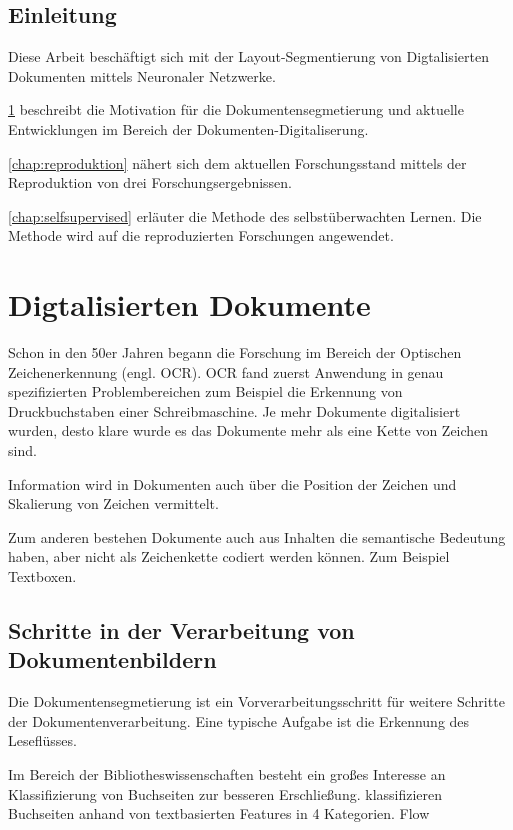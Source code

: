 \section*{Einleitung}
Diese Arbeit beschäftigt sich mit der Layout-Segmentierung von Digtalisierten Dokumenten mittels Neuronaler Netzwerke.

\cref{chap:documents} beschreibt die Motivation für die Dokumentensegmetierung und aktuelle Entwicklungen im
Bereich der Dokumenten-Digitaliserung.

\cref{chap:reproduktion} nähert sich dem aktuellen Forschungsstand mittels der Reproduktion von drei Forschungsergebnissen.

\cref{chap:selfsupervised} erläuter die Methode des selbstüberwachten Lernen. Die Methode wird auf die reproduzierten Forschungen angewendet.

\chapter{Digtalisierten Dokumente}
\label{chap:documents}


% 
Schon in den 50er Jahren begann die Forschung im Bereich der Optischen Zeichenerkennung 
(engl. OCR)\autocite{doermann_evolution_2014}. OCR fand zuerst Anwendung in genau 
spezifizierten Problembereichen zum Beispiel die Erkennung von Druckbuchstaben einer Schreibmaschine. 
Je mehr Dokumente digitalisiert wurden, desto klare wurde es das Dokumente mehr als 
eine Kette von Zeichen sind. 


Information wird in Dokumenten auch über die Position der Zeichen und Skalierung von Zeichen vermittelt.

Zum anderen bestehen Dokumente auch aus Inhalten die semantische Bedeutung haben, aber nicht als
Zeichenkette codiert werden können. 
Zum Beispiel Textboxen.


\section{Schritte in der Verarbeitung von Dokumentenbildern}
Die Dokumentensegmetierung ist ein Vorverarbeitungsschritt für weitere Schritte der Dokumentenverarbeitung.
Eine typische Aufgabe ist die Erkennung des Leseflüsses.

Im Bereich der Bibliotheswissenschaften besteht ein großes Interesse an Klassifizierung von
Buchseiten zur besseren Erschließung.
\cite{mcconnaughey_labeled_2017} klassifizieren Buchseiten anhand von textbasierten Features in 4 Kategorien. 
Flow
